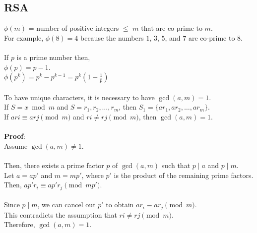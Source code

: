 \documentclass[11pt]{article}
\begin{document}
\subsection*{RSA}
$\phi(m)$ = number of positive integers $\leq$ $m$ that are co-prime to $m$. \\
For example, $\phi(8) = 4$ because the numbers $1$, $3$, $5$, and $7$ are co-prime to $8$.\\
\\
If $p$ is a prime number then, \\
$\phi(p) = p-1$. \\
$\phi(p^k) = p^k - p^{k-1} = p^k(1-\frac{1}{p})$\\
\\
To have unique characters, it is necessary to have $\gcd(a,m)=1$. \\
If $S = x \bmod m$ and $S = r_1, r_2, \dots, r_m$, then $S_1 = \{ar_1, ar_2, \dots, ar_m \}$. \\
If $ari \equiv arj \pmod m$ and $ri \neq rj \pmod m$, then $\gcd(a,m) = 1$.\\
\\
\textbf{Proof}:\\
Assume $\gcd(a,m) \neq 1$.\\
\\
Then, there exists a prime factor $p$ of $\gcd(a,m)$ such that $p\mid a$ and $p\mid m$. \\
Let $a = ap'$ and $m = mp'$, where $p'$ is the product of the remaining prime factors. \\
Then, $ap'r_i \equiv ap'r_j \pmod{mp'}$.\\
\\
Since $p\mid m$, we can cancel out $p'$ to obtain $ar_i \equiv ar_j \pmod m$. \\
This contradicts the assumption that $ri \neq rj \pmod m$. \\
Therefore, $\gcd(a,m) = 1$.
\end{document}
